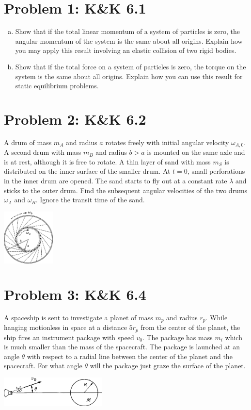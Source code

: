 \documentclass[problems]{esg8012pset}
\date{Month Day\csname latex@error\endcsname {Date not yet decided}}
\begin{document}
\section*{Problem 1: K\&K 6.1}
  \begin{enumerate}[(a)]
    \item Show that if the total linear momentum of a system of particles is zero, the angular momentum of the system is the same about all origins. Explain how you may apply this result involving an elastic collision of two rigid bodies.
    \item Show that if the total force on a system of particles is zero, the torque on the system is the same about all origins. Explain how you can use this result for static equilibrium problems.
  \end{enumerate}
\section*{Problem 2: K\&K 6.2}
  A drum of mass $m_A$ and radius $a$ rotates freely with initial angular velocity $\omega_{A,0}$. A second drum with mass $m_B$ and radius $b > a$ is mounted on the same axle and is at rest, although it is free to rotate. A thin layer of sand with mass $m_S$ is distributed on the inner surface of the smaller drum. At $t = 0$, small perforations in the inner drum are opened. The sand starts to fly out at a constant rate $\lambda$ and sticks to the outer drum. Find the subsequent angular velocities of the two drums $\omega_A$ and $\omega_B$. Ignore the transit time of the sand.
  \begin{center}\includegraphics[width=0.2\textwidth]{ps08_1}\end{center}
\section*{Problem 3: K\&K 6.4}
  A spaceship is sent to investigate a planet of mass $m_p$ and radius $r_p$. While hanging motionless in space at a distance $5 r_p$ from the center of the planet, the ship fires an instrument package with speed $v_0$. The package has mass $m_i$ which is much smaller than the mass of the spacecraft. The package is launched at an angle $\theta$ with respect to a radial line between the center of the planet and the spacecraft. For what angle $\theta$ will the package just graze the surface of the planet.
  \begin{center}\includegraphics[width=0.4\textwidth]{ps08_2}\end{center}
\end{document}
